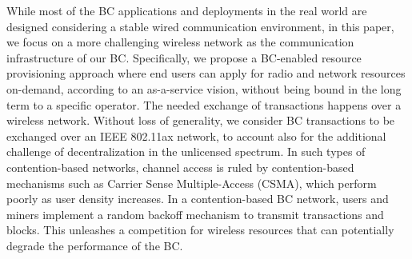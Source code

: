 \documentclass[conference]{IEEEtran}
\theoremstyle{definition}
\begin{document}
While most of the BC applications and deployments in the real world are designed considering a stable wired communication environment, in this paper, we focus on a more challenging wireless network as the communication infrastructure of our BC. Specifically, we propose a BC-enabled resource provisioning approach where end users can apply for radio and network resources on-demand, according to an as-a-service vision, without being bound in the long term to a specific operator. The needed exchange of transactions happens over a wireless network. Without loss of generality, we consider BC transactions to be exchanged over an IEEE 802.11ax network, to account also for the additional challenge of decentralization in the unlicensed spectrum. In such types of contention-based networks, channel access is ruled by contention-based mechanisms such as Carrier Sense Multiple-Access (CSMA), which perform poorly as user density increases. In a contention-based BC network, users and miners implement a random backoff mechanism to transmit transactions and blocks. This unleashes a competition for wireless resources that can potentially degrade the performance of the BC.
\end{document}
